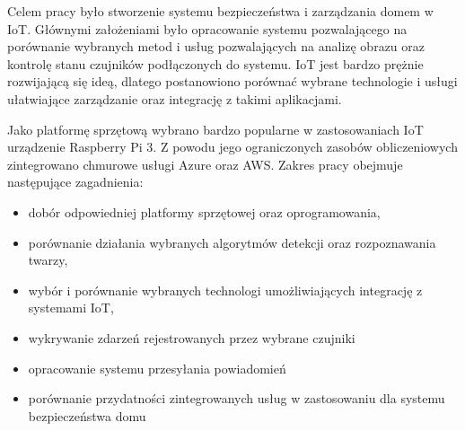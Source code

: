 Celem pracy było stworzenie systemu bezpieczeństwa i zarządzania domem w IoT. Głównymi założeniami było opracowanie systemu pozwalającego na porównanie wybranych metod i usług pozwalających na analizę obrazu oraz kontrolę stanu czujników podłączonych do systemu. IoT jest bardzo prężnie rozwijającą się ideą, dlatego postanowiono porównać wybrane technologie i usługi ułatwiające zarządzanie oraz integrację z takimi aplikacjami.

Jako platformę sprzętową wybrano bardzo popularne w zastosowaniach IoT urządzenie Raspberry Pi 3. Z powodu jego ograniczonych zasobów obliczeniowych zintegrowano chmurowe usługi Azure oraz AWS. Zakres pracy obejmuje następujące zagadnienia:
\begin{itemize}
\item dobór odpowiedniej platformy sprzętowej oraz oprogramowania,
\item porównanie działania wybranych algorytmów detekcji oraz rozpoznawania twarzy,
\item wybór i porównanie wybranych technologi umożliwiających integrację z systemami IoT,
\item wykrywanie zdarzeń rejestrowanych przez wybrane czujniki
\item opracowanie systemu przesyłania powiadomień
\item porównanie przydatności zintegrowanych usług w zastosowaniu dla systemu bezpieczeństwa domu
\end{itemize}